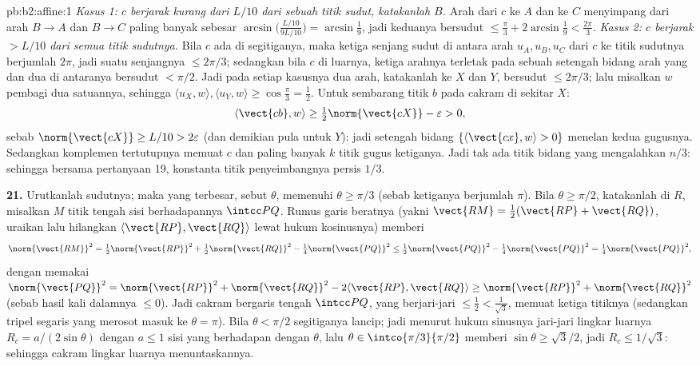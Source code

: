 \begin{solution}{pb:b2:affine:1}
\emph{Kasus 1: $c$ berjarak kurang dari $L/10$ dari sebuah titik sudut, katakanlah $B$.}
Arah dari $c$ ke $A$ dan ke $C$ menyimpang dari arah
$B \to A$ dan $B \to C$ paling banyak sebesar
$\arcsin\bigl(\tfrac{L/10}{9L/10}\bigr) = \arcsin\tfrac19$,
jadi keduanya bersudut $\leq \tfrac\pi3 + 2\arcsin\tfrac19 <
\tfrac{2\pi}3$. \emph{Kasus 2: $c$ berjarak $> L/10$
dari semua titik sudutnya.} Bila $c$ ada di segitiganya, maka ketiga
senjang sudut di antara arah $u_A, u_B, u_C$ dari $c$
ke titik sudutnya berjumlah $2\pi$, jadi suatu senjangnya $\leq 2\pi/3$;
sedangkan bila $c$ di luarnya, ketiga arahnya terletak pada sebuah setengah
bidang arah yang  dan dua di antaranya bersudut $<
\pi/2$. Jadi pada setiap kasusnya dua arah, katakanlah ke $X$ dan $Y$,
bersudut $\leq 2\pi/3$; lalu misalkan $w$ pembagi dua satuannya,
sehingga $\langle u_X, w\rangle, \langle u_Y, w\rangle \geq
\cos\tfrac\pi3 = \tfrac12$. Untuk sembarang titik $b$ pada cakram
di sekitar $X$:
\[
\langle \vect{cb}, w\rangle \geq
\tfrac12\norm{\vect{cX}} - \varepsilon > 0,
\]
sebab $\norm{\vect{cX}} \geq L/10 > 2\varepsilon$ (dan
demikian pula untuk $Y$): jadi setengah bidang  $\{\langle \vect{cx},
w\rangle > 0\}$ menelan kedua gugusnya. Sedangkan komplemen
tertutupnya memuat $c$ dan paling banyak $k$ titik gugus
ketiganya. Jadi tak ada titik bidang yang mengalahkan $n/3$: sehingga bersama
pertanyaan 19, konstanta titik penyeimbangnya persis $1/3$.

\textbf{21.} Urutkanlah sudutnya; maka yang terbesar, sebut $\theta$,
memenuhi $\theta \geq \pi/3$ (sebab ketiganya berjumlah $\pi$). Bila
$\theta \geq \pi/2$, katakanlah di $R$, misalkan $M$ titik tengah
sisi berhadapannya $\intcc PQ$. Rumus garis beratnya (yakni $\vect{RM}
= \tfrac12(\vect{RP} + \vect{RQ})$, uraikan lalu hilangkan
$\langle\vect{RP}, \vect{RQ}\rangle$ lewat hukum kosinusnya)
memberi
\[
\norm{\vect{RM}}^2 = \tfrac12\norm{\vect{RP}}^2 +
\tfrac12\norm{\vect{RQ}}^2 - \tfrac14\norm{\vect{PQ}}^2 \leq
\tfrac12\norm{\vect{PQ}}^2 - \tfrac14\norm{\vect{PQ}}^2 =
\tfrac14\norm{\vect{PQ}}^2,
\]
dengan memakai $\norm{\vect{PQ}}^2 = \norm{\vect{RP}}^2 +
\norm{\vect{RQ}}^2 - 2\langle\vect{RP}, \vect{RQ}\rangle \geq
\norm{\vect{RP}}^2 + \norm{\vect{RQ}}^2$ (sebab hasil kali dalamnya
$\leq 0$). Jadi cakram bergaris tengah $\intcc PQ$, yang berjari-jari
$\leq \tfrac12 < \tfrac1{\sqrt3}$, memuat ketiga titiknya
(sedangkan tripel segaris yang merosot masuk ke $\theta = \pi$). Bila
$\theta < \pi/2$ segitiganya lancip; jadi menurut hukum sinusnya
jari-jari lingkar luarnya $R_c = a/(2\sin\theta)$ dengan $a \leq 1$
sisi yang berhadapan dengan $\theta$, lalu $\theta \in
\intco{\pi/3}{\pi/2}$ memberi $\sin\theta \geq \sqrt3/2$, jadi
$R_c \leq 1/\sqrt3$: sehingga cakram lingkar luarnya menuntaskannya.


\end{solution}
